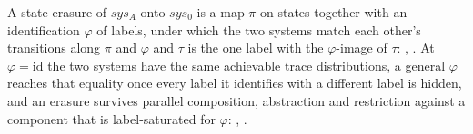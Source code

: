 \begin{definition}
  \label{def:erasure-sim}
  \leanok
  A state erasure of $sys_A$ onto $sys_0$ is a map $\pi$ on states together with an identification $\varphi$ of labels, under which the two systems match each other's transitions along $\pi$ and $\varphi$ and $\tau$ is the one label with the $\varphi$-image of $\tau$: , .
  At $\varphi = \mathrm{id}$ the two systems have the same achievable trace distributions, a general $\varphi$ reaches that equality once every label it identifies with a different label is hidden, and an erasure survives parallel composition, abstraction and restriction against a component that is label-saturated for $\varphi$: , .
\end{definition}
